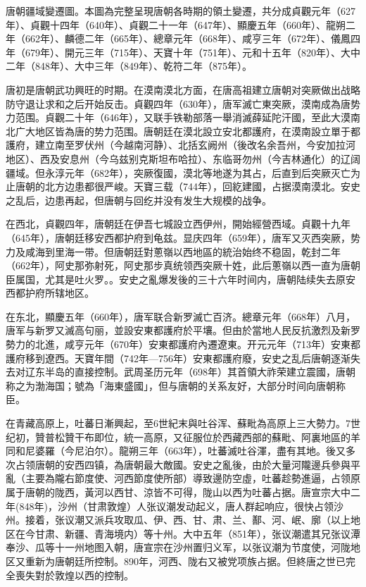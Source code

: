 唐朝疆域變遷圖。本圖為完整呈現唐朝各時期的領土變遷，共分成貞觀元年（627年）、貞觀十四年（640年）、貞觀二十一年（647年）、顯慶五年（660年）、龍朔二年（662年）、麟德二年（665年）、總章元年（668年）、咸亨三年（672年）、儀鳳四年（679年）、開元三年（715年）、天寶十年（751年）、元和十五年（820年）、大中二年（848年）、大中三年（849年）、乾符二年（875年）。

唐初是唐朝武功興旺的时期。在漠南漠北方面，在唐高祖建立唐朝对突厥做出战略防守退让求和之后开始反击。貞觀四年（630年），唐军滅亡東突厥，漠南成為唐势力范围。貞觀二十年（646年），又联手铁勒部落一舉消滅薛延陀汗國，至此大漠南北广大地区皆為唐的势力范围。唐朝廷在漠北設立安北都護府，在漠南設立單于都護府，建立南至罗伏州（今越南河静）、北括玄阙州（後改名余吾州，今安加拉河地区）、西及安息州（今乌兹别克斯坦布哈拉）、东临哥勿州（今吉林通化）的辽阔疆域。但永淳元年（682年），突厥復國，漠北等地遂为其占，后直到后突厥灭亡为止唐朝的北方边患都很严峻。天寶三载（744年），回紇建國，占据漠南漠北。安史之乱后，边患再起，但唐朝与回纥并没有发生大规模的战争。

在西北，貞觀四年，唐朝廷在伊吾七城設立西伊州，開始經營西域。貞觀十九年（645年），唐朝廷移安西都护府到龟兹。显庆四年（659年），唐军又灭西突厥，势力及咸海到里海一带。但唐朝廷對蔥嶺以西地區的統治始终不稳固，乾封二年（662年），阿史那弥射死，阿史那步真统领西突厥十姓，此后蔥嶺以西一直为唐朝臣属国，尤其是吐火罗。。安史之亂爆发後的三十六年时间内，唐朝陆续失去原安西都护府所辖地区。

在东北，顯慶五年（660年），唐军联合新罗滅亡百济。總章元年（668年）八月，唐军与新罗又滅高句丽，並設安東都護府於平壤。但由於當地人民反抗激烈及新罗勢力的北進，咸亨元年（670年）安東都護府內遷遼東。开元元年（713年）安東都護府移到遼西。天寶年間（742年—756年）安東都護府廢，安史之乱后唐朝逐渐失去对辽东半岛的直接控制。武周圣历元年（698年）其首領大祚荣建立震國，唐朝称之为渤海国；號為「海東盛國」，但与唐朝的关系友好，大部分时间向唐朝称臣。

在青藏高原上，吐蕃日漸興起，至6世紀末與吐谷浑、蘇毗為高原上三大勢力。7世纪初，贊普松贊干布即位，統一高原，又征服位於西藏西部的蘇毗、阿裏地區的羊同和尼婆羅（今尼泊尔）。龍朔三年（663年），吐蕃滅吐谷渾，盡有其地。後又多次占领唐朝的安西四镇，為唐朝最大敵國。安史之亂後，由於大量河隴邊兵參與平亂（主要為隴右節度使、河西節度使所部）導致邊防空虛，吐蕃趁勢進逼，占领原属于唐朝的陇西，黃河以西甘、涼皆不可得，陇山以西为吐蕃占据。唐宣宗大中二年(848年)，沙州（甘肃敦煌）人张议潮发动起义，唐人群起响应，很快占领沙州。接着，张议潮又派兵攻取瓜、伊、西、甘、肃、兰、鄯、河、岷、廓（以上地区在今甘肃、新疆、青海境内）等十州。大中五年（851年），张议潮遣其兄张议潭奉沙、瓜等十一州地图入朝，唐宣宗在沙州置归义军，以张议潮为节度使，河陇地区又重新为唐朝廷所控制。890年，河西、陇右又被党项族占据。但終唐之世已完全喪失對於敦煌以西的控制。

